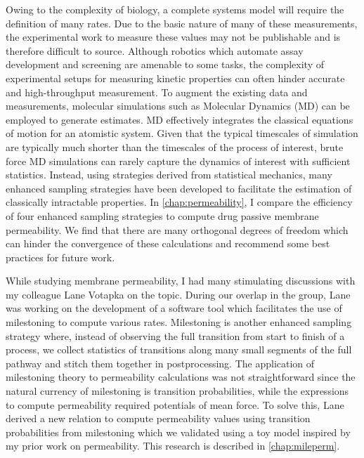 \par Owing to the complexity of biology, a complete systems model will require the definition of many rates.
Due to the basic nature of many of these measurements, the experimental work to measure these values may not be publishable and is therefore difficult to source.
Although robotics which automate assay development and screening are amenable to some tasks, the complexity of experimental setups for measuring kinetic properties can often hinder accurate and high-throughput measurement.
To augment the existing data and measurements, molecular simulations such as Molecular Dynamics (MD) can be employed to generate estimates\cite{Leach2001,Durrant2011a}.
MD effectively integrates the classical equations of motion for an atomistic system.
Given that the typical timescales of simulation are typically much shorter than the timescales of the process of interest, brute force MD simulations can rarely capture the dynamics of interest with sufficient statistics.
Instead, using strategies derived from statistical mechanics, many enhanced sampling strategies have been developed to facilitate the estimation of classically intractable properties\cite{Chipot2007,Tuckerman2010}.
In \cref{chap:permeability}, I compare the efficiency of four enhanced sampling strategies to compute drug passive membrane permeability.
We find that there are many orthogonal degrees of freedom which can hinder the convergence of these calculations and recommend some best practices for future work.

\par While studying membrane permeability, I had many stimulating discussions with my colleague Lane Votapka on the topic.
During our overlap in the group, Lane was working on the development of a software tool which facilitates the use of milestoning to compute various rates.
Milestoning is another enhanced sampling strategy where, instead of observing the full transition from start to finish of a process, we collect statistics of transitions along many small segments of the full pathway and stitch them together in postprocessing\cite{Faradjian2004,Majek2010,Vanden-Eijnden2008,Kirmizialtin2011,Votapka2015,Bello-Rivas2015,Votapka2017c}.
The application of milestoning theory to permeability calculations was not straightforward since the natural currency of milestoning is transition probabilities, while the expressions to compute permeability required potentials of mean force.
To solve this, Lane derived a new relation to compute permeability values using transition probabilities from milestoning which we validated using a toy model inspired by my prior work on permeability.
This research is described in \cref{chap:mileperm}.

